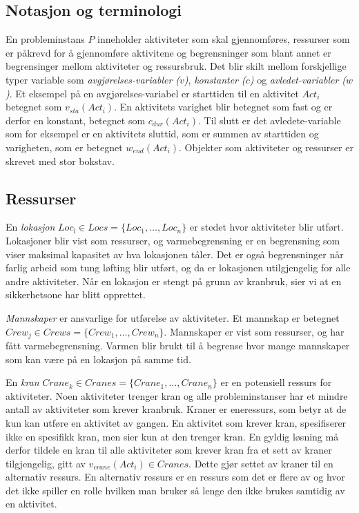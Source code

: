 \subsection{Notasjon og terminologi}
En probleminstans $ P $ inneholder aktiviteter som skal gjennomføres, ressurser som er påkrevd for å gjennomføre aktivitene og begrensninger som blant annet er begrensinger mellom aktiviteter og ressursbruk. Det blir skilt mellom forskjellige typer variable som \textit{avgjørelses-variabler ($ v $)}, \textit{konstanter ($ c $)} og \textit{avledet-variabler ($ w $)}. Et eksempel på en avgjørelses-variabel er starttiden til en aktivitet $ Act_{i} $ betegnet som $ v_{sta}(Act_{i}) $. En aktivitets varighet blir betegnet som fast og er derfor en konstant, betegnet som $ c_{dur}(Act_{i}) $. Til slutt er det avledete-variable som for eksempel er en aktivitets sluttid, som er summen av starttiden og varigheten, som er betegnet $ w_{end}(Act_{i}) $. Objekter som aktiviteter og ressurser er skrevet med stor bokstav.

\subsection{Ressurser}
En \textit{lokasjon} $ Loc_{l} \in Locs = \{ Loc_{1},\dots,Loc_{n} \} $ er stedet hvor aktiviteter blir utført. Lokasjoner blir vist som ressurser, og varmebegrensning er en begrensning som viser maksimal kapasitet av hva lokasjonen tåler. Det er også begrensninger når farlig arbeid som tung løfting blir utført, og da er lokasjonen utilgjengelig for alle andre aktiviteter. Når en lokasjon er stengt på grunn av kranbruk, sier vi at en sikkerhetsone har blitt opprettet.

\textit{Mannskaper} er ansvarlige for utførelse av aktiviteter. Et mannskap er betegnet $ Crew_{j} \in Crews = \{ Crew_{1},\dots,Crew_{n} \} $. Mannskaper er vist som ressurser, og har fått varmebegrensning. Varmen blir brukt til å begrense hvor mange mannskaper som kan være på en lokasjon på samme tid.

En \textit{kran} $ Crane_{k} \in Cranes = \{ Crane_{1},\dots,Crane_{n} \} $ er en potensiell ressurs for aktiviteter. Noen aktiviteter trenger kran og alle probleminstanser har et mindre antall av aktiviteter som krever kranbruk. Kraner er eneressurs,  som betyr at de kun kan utføre en aktivitet av gangen. En aktivitet som krever kran, spesifiserer ikke en spesifikk kran, men sier kun at den trenger kran. En gyldig løsning må derfor tildele en kran til alle aktiviteter som krever kran fra et sett av kraner tilgjengelig, gitt av $ v_{crane}(Act_{i}) \in Cranes $. Dette gjør settet av kraner til en alternativ ressurs. En alternativ ressurs er en ressurs som det er flere av og hvor det ikke spiller en rolle hvilken man bruker så lenge den ikke brukes samtidig av en aktivitet.

